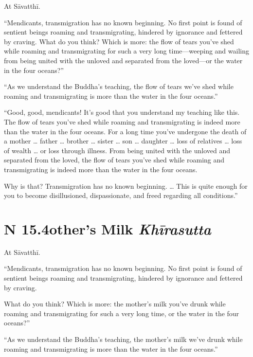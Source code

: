 \documentclass[12pt,openany]{book}%
\newcommand*{\suttatitleacronym}[1]{\smaller[2]{#1}\vspace*{.3em}}
\newcommand*{\suttatitletranslation}[1]{\linebreak{#1}}
\newcommand*{\suttatitleroot}[1]{\linebreak\smaller[2]\itshape{#1}}
\newcommand*{\tocacronym}[1]{\hspace*{-3.3em}{#1}\quad}
\newcommand*{\toctranslation}[1]{#1}
\newcommand*{\tocroot}[1]{(\textit{#1})}
\begin{document}
At \textsanskrit{Sāvatthī}. 

“Mendicants, transmigration has no known beginning. No first point is found of sentient beings roaming and transmigrating, hindered by ignorance and fettered by craving. What do you think? Which is more: the flow of tears you’ve shed while roaming and transmigrating for such a very long time—weeping and wailing from being united with the unloved and separated from the loved—or the water in the four oceans?” 

“As we understand the Buddha’s teaching, the flow of tears we’ve shed while roaming and transmigrating is more than the water in the four oceans.” 

“Good, good, mendicants! It’s good that you understand my teaching like this. The flow of tears you’ve shed while roaming and transmigrating is indeed more than the water in the four oceans. For a long time you’ve undergone the death of a mother … father … brother … sister … son … daughter … loss of relatives … loss of wealth … or loss through illness. From being united with the unloved and separated from the loved, the flow of tears you’ve shed while roaming and transmigrating is indeed more than the water in the four oceans. 

Why is that? Transmigration has no known beginning. … This is quite enough for you to become disillusioned, dispassionate, and freed regarding all conditions.” 

%
\section*{{\suttatitleacronym SN 15.4}{\suttatitletranslation Mother’s Milk }{\suttatitleroot Khīrasutta}}
\addcontentsline{toc}{section}{\tocacronym{SN 15.4} \toctranslation{Mother’s Milk } \tocroot{Khīrasutta}}

At \textsanskrit{Sāvatthī}. 

“Mendicants, transmigration has no known beginning. No first point is found of sentient beings roaming and transmigrating, hindered by ignorance and fettered by craving. 

What do you think? Which is more: the mother’s milk you’ve drunk while roaming and transmigrating for such a very long time, or the water in the four oceans?” 

“As we understand the Buddha’s teaching, the mother’s milk we’ve drunk while roaming and transmigrating is more than the water in the four oceans.” 
\end{document}
